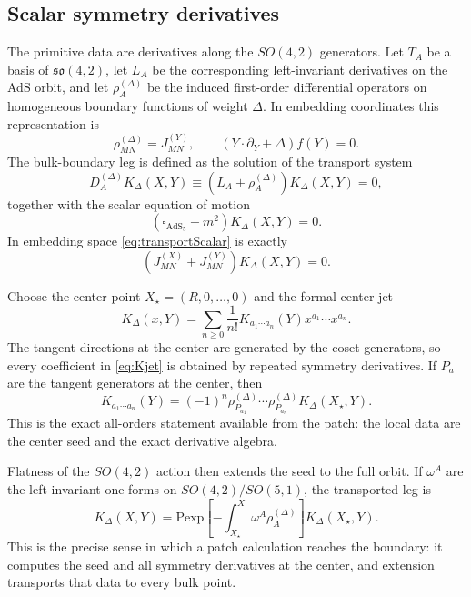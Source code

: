 \documentclass[11pt]{article}
\newcommand{\AdS}{\mathrm{AdS}_5}
\newcommand{\bdy}{\partial}
\renewcommand{\Box}{\square}
\begin{document}
\subsection{Scalar symmetry derivatives}

The primitive data are derivatives along the $SO(4,2)$ generators. Let $T_A$ be a basis of $\mathfrak{so}(4,2)$, let $L_A$ be the corresponding left-invariant derivatives on the AdS orbit, and let $\rho_A^{(\Delta)}$ be the induced first-order differential operators on homogeneous boundary functions of weight $\Delta$. In embedding coordinates this representation is
\begin{equation}
\rho_{MN}^{(\Delta)}=J_{MN}^{(Y)},
\qquad
\left(Y\cdot\bdy_Y+\Delta\right)f(Y)=0.
\label{eq:rhoY}
\end{equation}
The bulk-boundary leg is defined as the solution of the transport system
\begin{equation}
D_A^{(\Delta)}K_\Delta(X,Y)\equiv \left(L_A+\rho_A^{(\Delta)}\right)K_\Delta(X,Y)=0,
\label{eq:transportScalar}
\end{equation}
together with the scalar equation of motion
\begin{equation}
(\Box_{\AdS}-m^2)K_\Delta(X,Y)=0.
\label{eq:Keom}
\end{equation}
In embedding space \cref{eq:transportScalar} is exactly
\begin{equation}
\left(J^{(X)}_{MN}+J^{(Y)}_{MN}\right)K_\Delta(X,Y)=0.
\label{eq:Jcov}
\end{equation}

Choose the center point $X_\star=(R,0,\dots,0)$ and the formal center jet
\begin{equation}
K_\Delta(x,Y)
=
\sum_{n\ge 0}\frac{1}{n!}
K_{a_1\cdots a_n}(Y)x^{a_1}\cdots x^{a_n}.
\label{eq:Kjet}
\end{equation}
The tangent directions at the center are generated by the coset generators, so every coefficient in \cref{eq:Kjet} is obtained by repeated symmetry derivatives. If $P_a$ are the tangent generators at the center, then
\begin{equation}
K_{a_1\cdots a_n}(Y)
=
(-1)^n
\rho_{P_{a_1}}^{(\Delta)}\cdots \rho_{P_{a_n}}^{(\Delta)}K_\Delta(X_\star,Y).
\label{eq:jetfromder}
\end{equation}
This is the exact all-orders statement available from the patch: the local data are the center seed and the exact derivative algebra.

Flatness of the $SO(4,2)$ action then extends the seed to the full orbit. If $\omega^A$ are the left-invariant one-forms on $SO(4,2)/SO(5,1)$, the transported leg is
\begin{equation}
K_\Delta(X,Y)
=
\mathrm{Pexp}\!\left[-\int_{X_\star}^{X}\omega^A \rho_A^{(\Delta)}\right]
K_\Delta(X_\star,Y).
\label{eq:Ktransport}
\end{equation}
This is the precise sense in which a patch calculation reaches the boundary: it computes the seed and all symmetry derivatives at the center, and extension transports that data to every bulk point.
\end{document}
